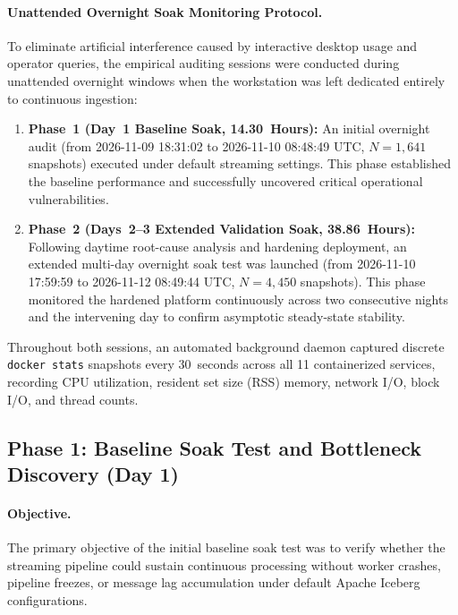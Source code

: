 \paragraph{Unattended Overnight Soak Monitoring Protocol.}
To eliminate artificial interference caused by interactive desktop usage and operator queries, the empirical auditing sessions were conducted during unattended overnight windows when the workstation was left dedicated entirely to continuous ingestion:
\begin{enumerate}
    \item \textbf{Phase~1 (Day~1 Baseline Soak, 14.30~Hours):} An initial overnight audit (from 2026-11-09 18:31:02 to 2026-11-10 08:48:49 UTC, $N = 1,641$ snapshots) executed under default streaming settings. This phase established the baseline performance and successfully uncovered critical operational vulnerabilities.
    \item \textbf{Phase~2 (Days~2--3 Extended Validation Soak, 38.86~Hours):} Following daytime root-cause analysis and hardening deployment, an extended multi-day overnight soak test was launched (from 2026-11-10 17:59:59 to 2026-11-12 08:49:44 UTC, $N = 4,450$ snapshots). This phase monitored the hardened platform continuously across two consecutive nights and the intervening day to confirm asymptotic steady-state stability.
\end{enumerate}

Throughout both sessions, an automated background daemon captured discrete \texttt{docker stats} snapshots every 30~seconds across all 11 containerized services, recording CPU utilization, resident set size (RSS) memory, network I/O, block I/O, and thread counts.

\subsection{Phase 1: Baseline Soak Test and Bottleneck Discovery (Day 1)}
\label{subsec:eval_phase1}

\paragraph{Objective.}
The primary objective of the initial baseline soak test was to verify whether the streaming pipeline could sustain continuous processing without worker crashes, pipeline freezes, or message lag accumulation under default Apache Iceberg configurations.

